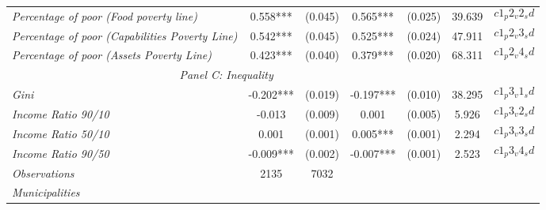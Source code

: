 \begin{tabular}{lcccccc}
\textit{Percentage of poor (Food poverty line)}  &  0.558***  
					   & (0.045) 
					   &  0.565***  
					   & (0.025) 
					   &  39.639  
					   &  $$c1_p2_v2_sd$$ \\[0.2cm]
					   
\textit{Percentage of poor (Capabilities Poverty Line)}  &  0.542***  
					   & (0.045) 
					   &  0.525***  
					   & (0.024) 
					   &  47.911  
					   &  $$c1_p2_v3_sd$$ \\[0.2cm]
					   
\textit{Percentage of poor (Assets Poverty Line)}  &  0.423***  
					   & (0.040) 
					   &  0.379***  
					   & (0.020) 
					   &  68.311  
					   &  $$c1_p2_v4_sd$$ \\[0.2cm]

\midrule                                                                                      
\multicolumn{5}{c}{\textit{Panel  C: Inequality}}   \\[0.2cm]  

\textit{Gini}  &  -0.202***  
					   & (0.019) 
					   &  -0.197***  
					   & (0.010) 
					   &  38.295  
					   &  $$c1_p3_v1_sd$$ \\[0.2cm]
					   
\textit{Income Ratio 90/10}  &  -0.013  
					   & (0.009) 
					   &  0.001  
					   & (0.005) 
					   &  5.926  
					   &  $$c1_p3_v2_sd$$ \\[0.2cm]
					   
\textit{Income Ratio 50/10}  &  0.001  
					   & (0.001) 
					   &  0.005***  
					   & (0.001) 
					   &  2.294  
					   &  $$c1_p3_v3_sd$$ \\[0.2cm]
					   
\textit{Income Ratio 90/50}  &  -0.009***  
					   & (0.002) 
					   &  -0.007***  
					   & (0.001) 
					   &  2.523  
					   &  $$c1_p3_v4_sd$$ \\[0.2cm]
					   

\midrule

\textit{Observations} 	  &   2135  & 7032   \\[0.2cm]
\textit{Municipalities}   &    &    \\[0.2cm]

\bottomrule

\end{tabular}%

